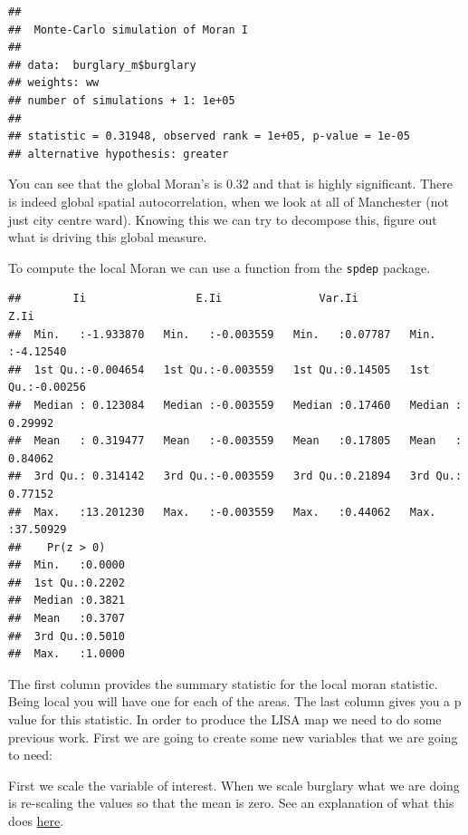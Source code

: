 \documentclass[]{book}
\newenvironment{Shaded}{\begin{snugshade}}{\end{snugshade}}
\newcommand{\KeywordTok}[1]{\textcolor[rgb]{0.13,0.29,0.53}{\textbf{#1}}}
\newcommand{\NormalTok}[1]{#1}
\newcommand{\OperatorTok}[1]{\textcolor[rgb]{0.81,0.36,0.00}{\textbf{#1}}}
\newcommand{\StringTok}[1]{\textcolor[rgb]{0.31,0.60,0.02}{#1}}
\begin{document}
\begin{verbatim}
## 
##  Monte-Carlo simulation of Moran I
## 
## data:  burglary_m$burglary 
## weights: ww  
## number of simulations + 1: 1e+05 
## 
## statistic = 0.31948, observed rank = 1e+05, p-value = 1e-05
## alternative hypothesis: greater
\end{verbatim}

You can see that the global Moran's is 0.32 and that is highly significant. There is indeed global spatial autocorrelation, when we look at all of Manchester (not just city centre ward). Knowing this we can try to decompose this, figure out what is driving this global measure.

To compute the local Moran we can use a function from the \texttt{spdep} package.

\begin{Shaded}
\end{Shaded}

\begin{verbatim}
##        Ii                 E.Ii               Var.Ii             Z.Ii         
##  Min.   :-1.933870   Min.   :-0.003559   Min.   :0.07787   Min.   :-4.12540  
##  1st Qu.:-0.004654   1st Qu.:-0.003559   1st Qu.:0.14505   1st Qu.:-0.00256  
##  Median : 0.123084   Median :-0.003559   Median :0.17460   Median : 0.29992  
##  Mean   : 0.319477   Mean   :-0.003559   Mean   :0.17805   Mean   : 0.84062  
##  3rd Qu.: 0.314142   3rd Qu.:-0.003559   3rd Qu.:0.21894   3rd Qu.: 0.77152  
##  Max.   :13.201230   Max.   :-0.003559   Max.   :0.44062   Max.   :37.50929  
##    Pr(z > 0)     
##  Min.   :0.0000  
##  1st Qu.:0.2202  
##  Median :0.3821  
##  Mean   :0.3707  
##  3rd Qu.:0.5010  
##  Max.   :1.0000
\end{verbatim}

The first column provides the summary statistic for the local moran statistic. Being local you will have one for each of the areas. The last column gives you a p value for this statistic. In order to produce the LISA map we need to do some previous work. First we are going to create some new variables that we are going to need:

First we scale the variable of interest. When we scale burglary what we are doing is re-scaling the values so that the mean is zero. See an explanation of what this does \href{http://www.gastonsanchez.com/visually-enforced/how-to/2014/01/15/Center-data-in-R/}{here}.
\end{document}
